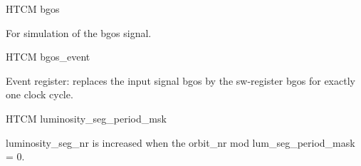 \begin{register}{H}{TCM bgos}{}%
	\label{bgos}%
	\regnewline%

	\begin{regdesc}
	\begin{reglist}
 		\item [bgos] For simulation of the bgos signal.
	\end{reglist}
	\end{regdesc}
\end{register}

\begin{register}{H}{TCM bgos\_event}{}%
	\label{bgos_event}%
	\regnewline%

	\begin{regdesc}
	\begin{reglist}
 		\item [bgos\_event] Event register: replaces the input signal bgos by the sw-register bgos for exactly one clock cycle.
	\end{reglist}
	\end{regdesc}
\end{register}

\begin{register}{H}{TCM luminosity\_seg\_period\_msk}{}%
	\label{luminosity_seg_period_msk}%

	\begin{regdesc}
	\begin{reglist}
 		\item [luminosity\_seg\_period\_msk] luminosity\_seg\_nr is increased when the orbit\_nr mod lum\_seg\_period\_mask = 0.
	\end{reglist}
	\end{regdesc}
\end{register}

